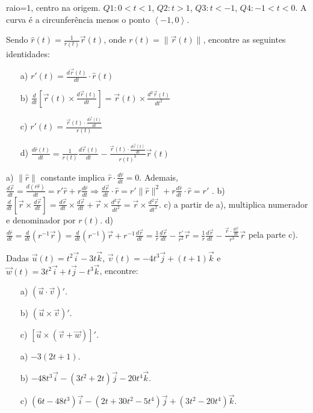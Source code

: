\begin{resp}raio=$1$, centro na origem. $Q1: 0<t<1$, $Q2:t>1$, $Q3:t<-1$, $Q4:-1<t<0$. A curva é a circunferência menos o ponto $\left<-1,0\right>$.
\end{resp}

\begin{exer}
Sendo $\hat{r}(t)=\frac{1}{r(t)} \vec{r}(t)$, onde $r(t)=\|\vec{r}(t)\|$,  encontre as seguintes identidades:
\begin{itemize}
\item[a)] $\displaystyle r'(t) = \frac{d\vec{r}(t)}{dt}\cdot \hat{r}(t)$
\item[b)] $\displaystyle \frac{d}{dt}\left[\vec{r}(t)\times\frac{d\vec{r}(t)}{dt}\right]=\vec{r}(t)\times\frac{d^2\vec{r}(t)}{dt^2}$ 
\item[c)] $\displaystyle r'(t)=\frac{\vec{r}(t)\cdot\frac{d\vec{r}(t)}{dt}}{r(t)}$ 
\item[d)] $\displaystyle \frac{d\hat{r}(t)}{dt}=\frac{1}{r(t)} \frac{d\vec{r}(t)}{dt}-\frac{\vec{r}(t)\cdot\frac{d\vec{r}(t)}{dt}}{r(t)^3} \vec{r}(t)$
\end{itemize}
\end{exer}
\begin{resp}
a) $\|\hat{r}\|$ constante implica $\hat{r} \cdot \frac{d\hat{r}}{dt}=0$. Ademais, $ \frac{d\vec{r}}{dt} = \frac{d(r \hat{r})}{dt} = r' \hat{r} + r \frac{d\hat{r}}{dt} \Rightarrow \frac{d\vec{r}}{dt} \cdot \hat{r} = 
r' \|\hat{r}\|^2 + r \frac{d\hat{r}}{dt} \cdot \hat{r} = r' $ 
. b) $\frac{d}{dt} \left[ \vec{r} \times \frac{d\vec{r}}{dt} \right] =
\frac{d \vec{r}}{dt} \times \frac{d \vec{r}}{dt} + \vec{r} \times \frac{d^2 \vec{r}}{dt^2} = \vec{r} \times \frac{d^2 \vec{r}}{dt^2} $. c) a partir de a), multiplica numerador e denominador por $r(t)$. d) $\frac{d\hat{r}}{dt} = 
\frac{d}{dt} \left( r^{-1} \vec{r} \right) = \frac{d}{dt} \left( r^{-1} \right) \vec{r} + r^{-1} \frac{d \vec{r}}{dt} = \frac{1}{r} \frac{d\vec{r}}{dt} - \frac{r'}{r^2} \vec{r} = \frac{1}{r} \frac{d \vec{r}}{dt} - \frac{ \vec{r} \cdot \frac{d \vec{r}}{dt} }{r^3} \vec{r} $ pela parte c). 
\end{resp}
\begin{exer}Dadas $\vec{u}(t)=t^2\vec{i}-3t\vec{k}$, $\vec{v}(t)=-4t^3\vec{j}+(t+1)\vec{k}$ e $\vec{w}(t)=3t^2\vec{i}+t\vec{j}-t^3\vec{k}$, encontre:
\begin{itemize}
 \item[a)] $(\vec{u}\cdot \vec{v})'$.
 \item[b)] $(\vec{u}\times \vec{v})'$.
 \item[c)] $\left[\vec{u}\times (\vec{v}+\vec{w})\right]'$.
\end{itemize}
\end{exer}
\begin{resp}
\begin{itemize}
 \item[a)] $-3(2t+1)$.
 \item[b)] $-48t^3\vec{i}-(3t^2+2t)\vec{j}-20t^4\vec{k}$.
 \item[c)] $(6t-48t^3)\vec{i}-(2t+30t^2-5t^4)\vec{j}+(3t^2-20t^4)\vec{k}$.
\end{itemize} 
\end{resp}
